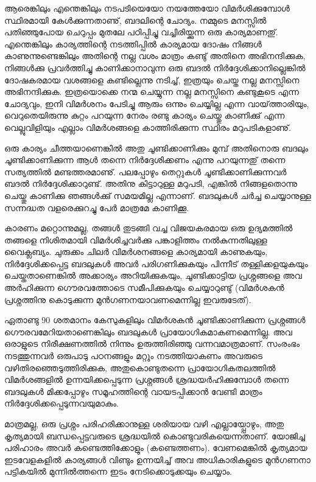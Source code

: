 
\vskip 2pt

ആരെങ്കിലും എന്തെങ്കിലും നടപടിയെയോ നയത്തേയോ വിമര്‍ശിക്കുമ്പോള്‍ സ്ഥിരമായി കേള്‍ക്കുന്നതാണു്, ബദലിന്റെ ചോദ്യം. 
നമ്മുടെ മനസ്സില്‍ പതിഞ്ഞുപോയ ചെറുപ്പം മുതലേ പഠിപ്പിച്ചു വച്ചിരിയ്ക്കുന്ന ഒരു കാര്യമാണതു്. എന്തെങ്കിലും കാര്യത്തിന്റെ നടത്തിപ്പില്‍ 
കാര്യമായ ദോഷം നിങ്ങള്‍ കാണുന്നുണ്ടെങ്കിലും അതിന്റെ നല്ല വശം മാത്രം കണ്ടു് അതിനെ അഭിനന്ദിക്കുക, നിങ്ങള്‍ക്കു പ്രവര്‍ത്തിച്ചു
 കാണിക്കാനാവുന്ന ഒരു ബദല്‍ നിര്‍ദ്ദേശിക്കാനില്ലെങ്കില്‍ ദോഷകരമായ വശങ്ങളെ കണ്ടില്ലെന്നു നടിച്ച്, ഇത്രയും ചെയ്ത നല്ല മനസ്സിനെ 
 അഭിനന്ദിക്കുക. ഇത്രയൊക്കെ നന്മ ചെയ്യുന്ന നല്ല മനസ്സിനെ കണ്ടുകൂടെ എന്ന ചോദ്യവും, ഇനി വിമര്‍ശനം പേടിച്ചു ആരും ഒന്നും ചെയ്യില്ല 
 എന്ന വായ്‌ത്താരിയും, വെറുതെയിരുന്നു കുറ്റം പറയുന്ന നേരം രണ്ടു കാര്യം ചെയ്തു കാണിക്കു് എന്ന വെല്ലുവിളിയും എല്ലാം വിമര്‍ശങ്ങളെ 
 കാത്തിരിക്കുന്ന സ്ഥിരം മറുപടികളാണു്.

ഒരു കാര്യം ചീത്തയാണെങ്കില്‍ അതു ചൂണ്ടിക്കാണിക്കും മുമ്പ് അതിനൊരു ബദലും ചൂണ്ടിക്കാണിക്കുന്ന ആള്‍ തന്നെ നിര്‍ദ്ദേശിക്കണം 
എന്നു പറയുന്നതു് തന്നെ സത്യത്തില്‍ മണ്ടത്തരമാണു്. പലപ്പോഴും തെറ്റുകള്‍ ചൂണ്ടിക്കാണിക്കുന്നവര്‍ ബദല്‍ നിര്‍ദ്ദേശിക്കാറുണ്ട്. 
അതിനു കിട്ടാറുള്ള മറുപടി, എങ്കില്‍ നിങ്ങളതൊന്നു ചെയ്തു കാണിക്കു ഞങ്ങള്‍ക്കു് സമയമില്ല എന്നാണ്. ബദലുകള്‍ ചര്‍ച്ച ചെയ്യാനുള്ള
 സന്നദ്ധത വളരെക്കുറച്ചു പേര്‍ മാത്രമേ കാണിക്കൂ.

കാരണം മറ്റൊന്നുമല്ല, തങ്ങള്‍ തുടങ്ങി വച്ച വിജയകരമായ ഒരു ഉദ്യമത്തില്‍ തങ്ങളെ നിശിതമായി വിമര്‍ശിച്ചവര്‍ക്കു പങ്കാളിത്തം
 നല്‍കുന്നതിലുള്ള വൈക്ലബ്യം. ചുരുക്കം ചിലര്‍ വിമര്‍ശനങ്ങളെ കാര്യമായി കാണുകയും, നിര്‍ദ്ദേശിക്കപ്പെട്ട ബദലുകള്‍ അവര്‍ 
 പരിഗണിക്കുകയും പിന്നീട് തള്ളിക്കളയുകയും ചെയ്തതാണെങ്കില്‍ അക്കാര്യം അറിയിക്കുകയും, ചൂണ്ടിക്കാട്ടിയ പ്രശ്നങ്ങളെ അവ അര്‍ഹിക്കുന്ന 
 ഗൌരവത്തോടെ സമീപിക്കുകയും ചെയ്യാറുണ്ടു് (വിമര്‍ശകന്‍ പ്രശ്നത്തിനു കൊടുക്കുന്ന മുന്‍ഗണനയാവണമെന്നില്ല ഇവരുടേത്).

ഏതാണ്ടു 90 ശതമാനം കേസുകളിലും വിമര്‍ശകന്‍ ചൂണ്ടിക്കാണിക്കുന്ന പ്രശ്നങ്ങള്‍ ഗൌരവമേറിയതാണെങ്കിലും ബദലുകള്‍ 
പ്രായോഗികമാകണമെന്നില്ല. അവ ഒരാളുടെ നിരീക്ഷണത്തില്‍ നിന്നും ഉരുത്തിരിഞ്ഞു വന്നവമാത്രമാണ്. 
സംരംഭം നടത്തുന്നവര്‍ ഒരുപാടു പഠനങ്ങളും മറ്റും നടത്തിയാകണം അവരുടെ വഴിതിരഞ്ഞെടുത്തിരിക്കുക, അതുകൊണ്ടുതന്നെ
 പ്രായോഗികതലത്തില്‍ വിമര്‍ശങ്ങളില്‍ ഉന്നയിക്കപ്പെടുന്ന പ്രശ്നങ്ങള്‍ ശ്രദ്ധയര്‍ഹിക്കുമ്പോള്‍ തന്നെ ബദലുകള്‍ മിക്കപ്പോഴും 
 സമൂഹത്തിന്റെ വായടപ്പിക്കാന്‍ വേണ്ടി മാത്രം നിര്‍ദ്ദേശിക്കപ്പെടുന്നവയുമാകും.

മാത്രമല്ല, ഒരു പ്രശ്നം പരിഹരിക്കാനുള്ള ശരിയായ വഴി എല്ലായ്പ്പോഴും, അതു കൃത്യമായി ബന്ധപ്പെട്ടവരുടെ ശ്രദ്ധയില്‍ 
കൊണ്ടുവരികയെന്നതാണ്. യോജിച്ച പരിഹാരം അവര്‍ കണ്ടെത്തിക്കോളും (കണ്ടെത്തണം). വേണമെങ്കില്‍ കൃത്യമായ ഇടവേളകളില്‍ 
കാര്യങ്ങള്‍ വിണ്ടും ഉന്നയിച്ച് അവ അധികാരികളുടെ മുന്‍ഗണനാ പട്ടികയില്‍ മുന്നില്‍ത്തന്നെ ഇടം നേടിക്കൊടുക്കയും ചെയ്യാം.

